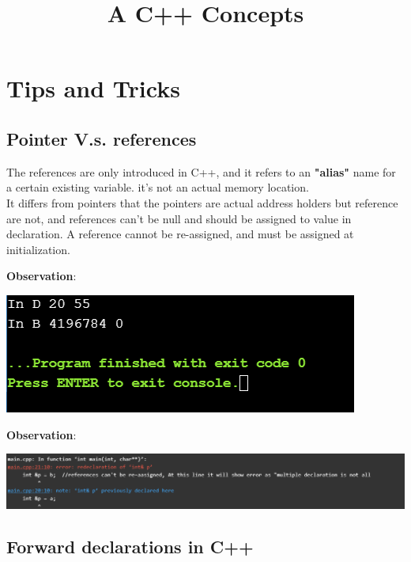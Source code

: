 \documentclass{article}
\title{\textbf{A C++ Concepts}}
\author{}
\date{}
\begin{document}
\maketitle
\tableofcontents
\lstlistoflistings

\section{Tips and Tricks}
\subsection{Pointer V.s. references}
The references are only introduced in C++, and it refers to an \textbf{"alias"} name for a certain existing variable. it's not an actual memory location.\\
It differs from pointers that the pointers are actual address holders but reference are not, and references can't be null and should be assigned to value in declaration. 
A reference cannot be re-assigned, and must be assigned at initialization.


\textbf{Observation}:\\
\begin{center}
  \includegraphics[scale=0.75]{./cpp_code/basic/sliceoff.PNG}
\end{center}

\textbf{Observation}:\\
\begin{center}
  \includegraphics[scale=0.75]{./cpp_code/basic/refsvspointers.PNG}
\end{center}

\subsection{Forward declarations in C++}
\end{document}
